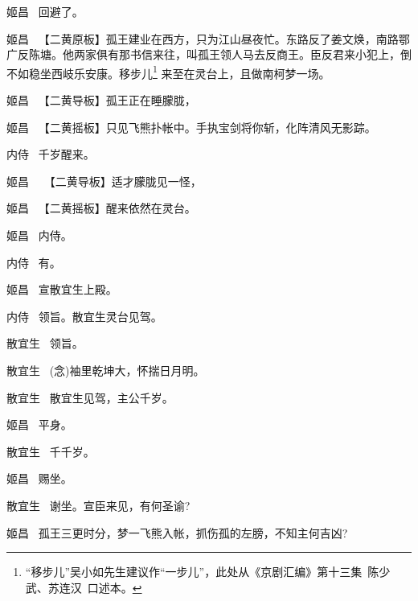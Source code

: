 {姬昌\hspace{30pt}~ 回避了。

\setlength{\hangindent}{60pt}   %
{姬昌\hspace{30pt}~ 【{\akai 二黄原板}】孤王建业在西方，只为江山昼夜忙。东路反了姜文焕，南路鄂广反陈塘。他两家俱有那书信来往，叫孤王领人马去反商王。臣反君来小犯上，倒不如稳坐西岐乐安康。移步儿\footnote{``移步儿''吴小如先生建议作``一步儿''，此处从《京剧汇编》第十三集~陈少武、苏连汉~口述本。}%
来至在灵台上，且做南柯梦一场。}

姬昌\hspace{30pt}~ 【{\akai 二黄导板}】孤王正在睡朦胧，

	姬昌\hspace{30pt}~ 【{\akai 二黄摇板}】只见飞熊扑帐中。手执宝剑将你斩，化阵清风无影踪。

内侍\hspace{30pt}~ 千岁醒来。

姬昌\hspace{30pt}~ ~【{\akai 二黄导板}】适才朦胧见一怪，

	姬昌\hspace{30pt}~ 【{\akai 二黄摇板}】醒来依然在灵台。

姬昌\hspace{30pt}~ 内侍。

内侍\hspace{30pt}~ 有。

姬昌\hspace{30pt}~ 宣散宜生上殿。

内侍\hspace{30pt}~ 领旨。散宜生灵台见驾。

散宜生\hspace{20pt}~ 领旨。

散宜生\hspace{20pt}~ ({\akai 念})袖里乾坤大，怀揣日月明。

散宜生 \hspace{20pt}~散宜生见驾，主公千岁。

姬昌\hspace{30pt}~ 平身。

散宜生\hspace{20pt}~ 千千岁。

姬昌\hspace{30pt}~ 赐坐。

散宜生\hspace{20pt}~ 谢坐。宣臣来见，有何圣谕?

姬昌\hspace{30pt}~ 孤王三更时分，梦一飞熊入帐，抓伤孤的左膀，不知主何吉凶?

}
